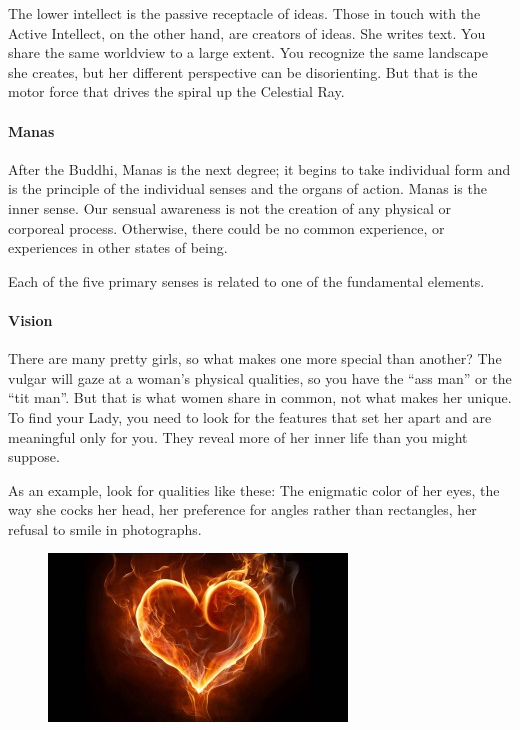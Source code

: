 The lower intellect is the passive receptacle of ideas. Those in touch with the Active Intellect, on the other hand, are creators of ideas. She writes text. You share the same worldview to a large extent. You recognize the same landscape she creates, but her different perspective can be disorienting. But that is the motor force that drives the spiral up the Celestial Ray.

\paragraph{Manas}
After the Buddhi, Manas is the next degree; it begins to take individual form and is the principle of the individual senses and the organs of action. Manas is the inner sense. Our sensual awareness is not the creation of any physical or corporeal process. Otherwise, there could be no common experience, or experiences in other states of being.

Each of the five primary senses is related to one of the fundamental elements.

\paragraph{Vision}
There are many pretty girls, so what makes one more special than another? The vulgar will gaze at a woman's physical qualities, so you have the “ass man” or the “tit man”. But that is what women share in common, not what makes her unique. To find your Lady, you need to look for the features that set her apart and are meaningful only for you. They reveal more of her inner life than you might suppose.

As an example, look for qualities like these: The enigmatic color of her eyes, the way she cocks her head, her preference for angles rather than rectangles, her refusal to smile in photographs.

\begin{figure}
 \includegraphics[scale=.5]{a20210207ThePathofCourtlyLove-img002.jpg}
\end{figure} 

